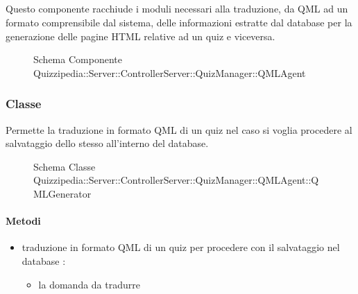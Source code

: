 \subsection{}
Questo componente racchiude i moduli necessari alla traduzione, da QML ad un formato comprensibile dal sistema, delle informazioni estratte dal database per la generazione delle pagine HTML relative ad un quiz e viceversa.
\begin{figure}[H]
\centering
\noindent{}
\caption[Schema Componente Quizzipedia::Server::ControllerServer::QuizManager::QMLAgent]{Schema Componente Quizzipedia::Server::ControllerServer::QuizManager::QMLAgent}
\end{figure}
\subsubsection{Classe }
Permette la traduzione in formato QML di un quiz nel caso si voglia procedere al salvataggio dello stesso all'interno del database.
\begin{figure}[H]
\centering
\noindent{}
\caption[Schema Classe QMLGenerator]{Schema Classe Quizzipedia::Server::ControllerServer::QuizManager::QMLAgent::QMLGenerator}
\end{figure}
\paragraph{Metodi}
\begin{itemize}
\item {}
\newline
traduzione in formato QML di un quiz per procedere con il salvataggio nel database
\newline
{} :
\begin{itemize}
\item {}
\newline
la domanda da tradurre
\end{itemize}
\end{itemize}
